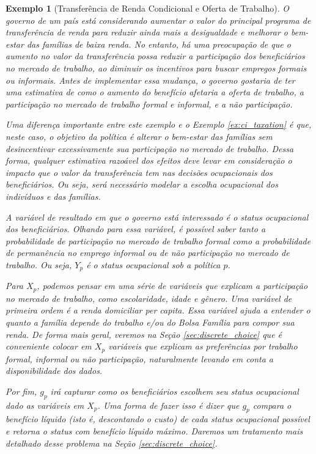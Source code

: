 \documentclass[12pt, a4paper, openany]{book}
\numberwithin{equation}{chapter}
\numberwithin{table}{chapter}
\numberwithin{figure}{chapter}
\theoremstyle{break}
\newtheorem{exemplo}{Exemplo}
\begin{document}
\vspace{0.25cm}

\begin{exemplo}[Transferência de Renda Condicional e Oferta de Trabalho]
\label{ex:cct_work}
O governo de um país está considerando aumentar o valor do principal programa de transferência de renda para reduzir ainda mais a desigualdade e melhorar o bem-estar das famílias de baixa renda. No entanto, há uma preocupação de que o aumento no valor da transferência possa reduzir a participação dos beneficiários no mercado de trabalho, ao diminuir os incentivos para buscar empregos formais ou informais. Antes de implementar essa mudança, o governo gostaria de ter uma estimativa de como o aumento do benefício afetaria a oferta de trabalho, a participação no mercado de trabalho formal e informal, e a não participação.

Uma diferença importante entre este exemplo e o Exemplo \ref{ex:ci_taxation} é que, neste caso, o objetivo da política é alterar o bem-estar das famílias sem desincentivar excessivamente sua participação no mercado de trabalho. Dessa forma, qualquer estimativa razoável dos efeitos deve levar em consideração o impacto que o valor da transferência tem nas decisões ocupacionais dos beneficiários. Ou seja, será necessário modelar a escolha ocupacional dos indivíduos e das famílias.

A variável de resultado em que o governo está interessado é o status ocupacional dos beneficiários. Olhando para essa variável, é possível saber tanto a probabilidade de participação no mercado de trabalho formal como a probabilidade de permanência no emprego informal ou de não participação no mercado de trabalho. Ou seja, $Y_p$ é o status ocupacional sob a política $p$.

Para $X_p$, podemos pensar em uma série de variáveis que explicam a participação no mercado de trabalho, como escolaridade, idade e gênero. Uma variável de primeira ordem é a renda domiciliar per capita. Essa variável ajuda a entender o quanto a família depende do trabalho e/ou do Bolsa Família para compor sua renda. De forma mais geral, veremos na Seção \ref{sec:discrete_choice} que é conveniente colocar em $X_p$ variáveis que explicam as preferências por trabalho formal, informal ou não participação, naturalmente levando em conta a disponibilidade dos dados.

Por fim, $g_p$ irá capturar como os beneficiários escolhem seu status ocupacional dado as variáveis em $X_p$. Uma forma de fazer isso é dizer que $g_p$ compara o benefício líquido (isto é, descontando o custo) de cada status ocupacional possível e retorna o status com benefício líquido máximo. Daremos um tratamento mais detalhado desse problema na Seção \ref{sec:discrete_choice}.

\end{exemplo}
\end{document}
